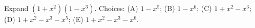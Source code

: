 Expand $(1+x^2)(1-x^3)$. Choices: (A) $1-x^5$; (B) $1-x^6$; (C) $1+x^2-x^3$; (D) $1+x^2-x^3-x^5$; (E) $1+x^2-x^3-x^6$.
